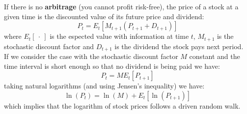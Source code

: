 If there is no \textbf{arbitrage} (you cannot profit risk-free), the price of a stock at a given time is the discounted value of its future price and dividend:
\begin{equation*}
    P_{t}=E_{t}[M_{t+1}(P_{t+1}+D_{t+1})]
\end{equation*}
where $E_{t}[\ \cdot\ ]$ is the espected value with information at time $t$, $M_{t+1}$ is the stochastic discount factor and $D_{t+1}$ is the dividend the stock pays next period.\\

If we consider the case with the stochastic discount factor $M$ constant and the time interval is short enough so that no dividend is being paid we have:
\begin{equation*}
    P_{t} = M E_{t}[P_{t+1}]
\end{equation*}
taking natural logarithms (and using Jensen's inequality) we have:
\begin{equation*}
    \ln(P_{t}) = \ln(M) + E_{t}[\ln(P_{t+1})]
\end{equation*}
which implies that the logarithm of stock prices follows a driven random walk.